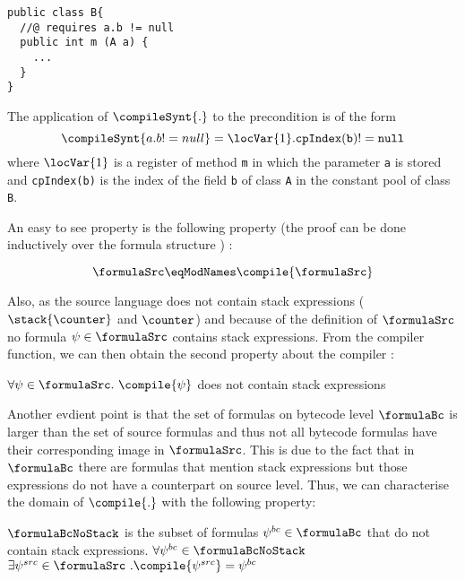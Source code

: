 \begin{verbatim}
public class B{
  //@ requires a.b != null
  public int m (A a) {
    ...
  }
}
\end{verbatim}

The application of  $ \compileSynt{.}$  to the precondition is of the form 
\[ \compileSynt{ a.b != null} = \locVar{1}.\tt{cpIndex(b)} != null \]
 where $\locVar{1}$ is a register of method \texttt{m} 
in which the parameter \texttt{a} is stored and \texttt{cpIndex(b)} is the index of the field \texttt{b} of class \texttt{A} in the constant pool of class \texttt{B}. 



An easy  to see property is the following property (the proof can be done inductively over the formula structure ) :
\begin{formulaCompProp1} \label{formulaCompProp1}
$$   \formulaSrc \eqModNames \compile{ \formulaSrc} $$
\end{formulaCompProp1}

Also, as the source language does not contain stack expressions ( $\stack{\counter}$ 
 and $\counter$) and because of the definition of
$\formulaSrc$ no formula $\psi \in \formulaSrc $ contains
stack expressions. From the compiler function, we can then obtain the second property about the compiler :
\begin{formulaCompProp1} \label{formulaCompProp2}
$   \forall \psi \in  \formulaSrc . \ \compile{ \psi } $ does not contain
stack expressions
\end{formulaCompProp1}

Another evdient point is that the set of formulas on bytecode level
 $\formulaBc$ is larger than the set of source formulas and thus not all
bytecode formulas have their corresponding image in $\formulaSrc$. This is due to the fact that in  
$\formulaBc$ there are formulas that mention stack expressions but those expressions do not have a counterpart on source level. 
Thus, we can characterise the domain of $ \compile{.}$ with the following property:

\begin{formulaCompProp0}
$\formulaBcNoStack$  is the subset of formulas $ \psi^{bc} \in \formulaBc$
 that do not contain stack expressions.  $\forall \psi^{bc} \in  \formulaBcNoStack $ 
$\exists \psi^{src} \in \formulaSrc \ . \compile{\psi^{src}} = \psi^{bc} $ 
\end{formulaCompProp0}

